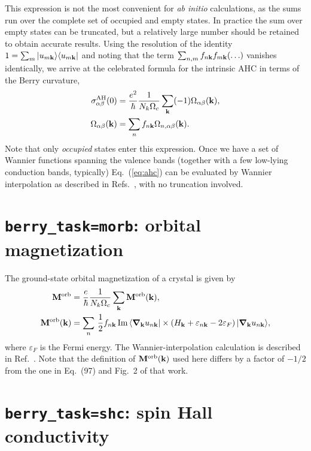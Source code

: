 This expression is not the most convenient for {\it ab initio}
calculations, as the sums run over the complete set of occupied and
empty states. In practice the sum over empty states can be truncated,
but a relatively large number should be retained to obtain accurate
results. Using the resolution of the identity $1=\sum_m \vert u_{m\bf
  k}\rangle \langle u_{m\bf k}\vert$ and noting that the term
$\sum_{n,m}f_{n\bf k}f_{m\bf k}(\ldots)$ vanishes identically, we
arrive at the celebrated formula for the intrinsic AHC in terms of the
Berry curvature,
%
\begin{align}
\label{eq:ahc}
\sigma^{\rm AH}_{\alpha\beta}(0)&=\frac{e^2}{\hbar}
\frac{1}{N_k\Omega_c}\sum_{\bf k}(-1)\Omega_{\alpha\beta}({\bf k}),\\
\label{eq:curv-occ}
\Omega_{\alpha\beta}({\bf k})&=\sum_n f_{n\bf k}\Omega_{n,\alpha\beta}({\bf k}).
\end{align}
%
Note that only {\it occupied} states enter this expression.  Once we
have a set of Wannier functions spanning the valence bands (together
with a few low-lying conduction bands, typically) Eq.~(\ref{eq:ahc})
can be evaluated by Wannier interpolation as described in
Refs.~\cite{wang-prb06,lopez-prb12}, with no truncation involved.


\section{{\tt berry\_task=morb}: orbital magnetization}

The ground-state orbital magnetization of a crystal is given
by~\cite{xiao-rmp10,ceresoli-prb06}
%
\begin{align}
\label{eq:morb}
{\bf M}^{\rm orb}&=\frac{e}{\hbar}
\frac{1}{N_k\Omega_c}\sum_{\bf k}{\bf M}^{\rm orb}({\bf k}),\\
\label{eq:morb-k}
{\bf M}^{\rm orb}({\bf k})&=
\sum_n\,\frac{1}{2}f_{n{\bf k}}\,
{\rm Im}\,\langle \bm{\nabla}_{\bf k}u_{n{\bf k}}\vert
\times
\left(H_{\bf k}+\varepsilon_{n{\bf k}}-2\varepsilon_F\right)
\vert \bm{\nabla}_{\bf k}u_{n{\bf k}}\rangle,
\end{align}
%
where $\varepsilon_F$ is the Fermi energy. The Wannier-interpolation
calculation is described in Ref.~\cite{lopez-prb12}. Note that the
definition of ${\bf M}^{\rm orb}({\bf k})$ used here differs by a
factor of $-1/2$ from the one in Eq.~(97) and Fig.~2 of that work.

\section{{\tt berry\_task=shc}: spin Hall conductivity}

